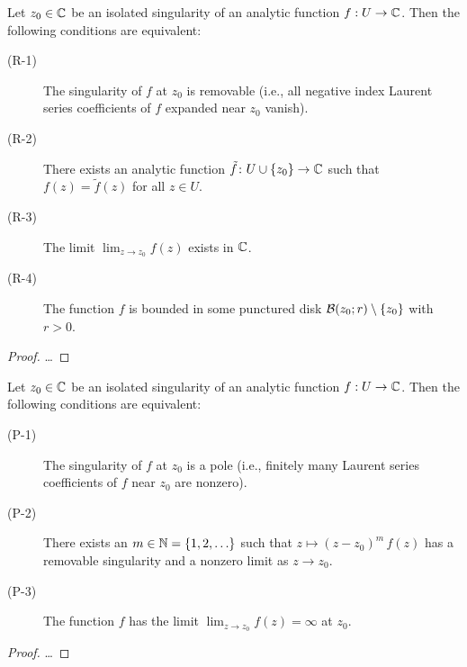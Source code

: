 \begin{theorem}
  \label{thm:removable_singularity}
  Let $z_0 \in \bC$ be an isolated singularity of
  an analytic function $f : U \to \bC$.
  Then the following conditions are equivalent:
  \begin{description}
    \item[(R-1)] The singularity of $f$ at $z_0$ is removable (i.e., all negative
      index Laurent series coefficients of $f$ expanded near $z_0$ vanish).
    \item[(R-2)] There exists an analytic function $\tilde{f} \colon U \cup \set{z_0} \to \bC$
      such that $f(z) = \tilde{f}(z)$ for all $z \in U$.
    \item[(R-3)] The limit $\lim_{z \to z_0} f(z)$ exists in $\bC$.
    \item[(R-4)] The function $f$ is bounded in some punctured disk
      $\BallRC{r}{z_0} \setminus \set{z_0}$ with $r>0$.
  \end{description}
\end{theorem}
\begin{proof}
  \ldots
\end{proof}


\begin{theorem}
  \label{thm:pole}
  Let $z_0 \in \bC$ be an isolated singularity of
  an analytic function $f : U \to \bC$.
  Then the following conditions are equivalent:
  \begin{description}
    \item[(P-1)] The singularity of $f$ at $z_0$ is a pole (i.e.,
      finitely many Laurent series coefficients of $f$ near $z_0$ are nonzero).
    \item[(P-2)] There exists an $m \in \bN = \set{1,2,\ldots}$
      such that $z \mapsto (z-z_0)^m \, f(z)$ has a removable singularity
      and a nonzero limit as $z \to z_0$.
    \item[(P-3)] The function $f$ has the limit $\lim_{z \to z_0} f(z) = \infty$ at $z_0$.
  \end{description}
\end{theorem}
\begin{proof}
  \ldots
\end{proof}


